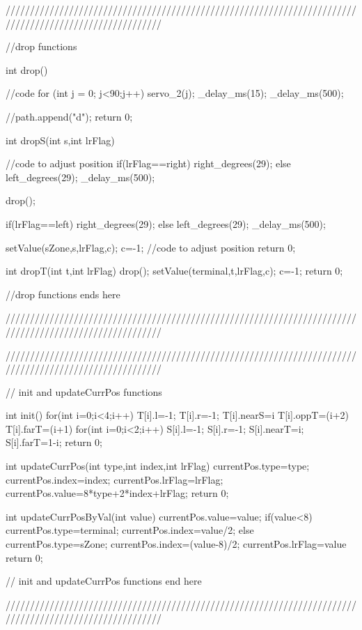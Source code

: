 ////////////////////////////////////////////////////////////////////////////////////////////////////////

//drop functions

int drop()
{
    //code
	for (int j = 0; j<90;j++)
	{ servo_2(j);
		_delay_ms(15);
	}
	_delay_ms(500);
	
    //path.append("d");
    return 0;
}

int dropS(int s,int lrFlag)
{
    //code to adjust position
    if(lrFlag==right)
    right_degrees(29);
    else
    left_degrees(29);
    _delay_ms(500);
	
	drop();
	
	if(lrFlag==left)
	right_degrees(29);
	else
	left_degrees(29);
	_delay_ms(500);

    setValue(sZone,s,lrFlag,c);
    c=-1;
    //code to adjust position
	return 0;
}

int dropT(int t,int lrFlag)
{
    drop();
    setValue(terminal,t,lrFlag,c);
    c=-1;
	return 0;
}

//drop functions ends here


////////////////////////////////////////////////////////////////////////////////////////////////////////






////////////////////////////////////////////////////////////////////////////////////////////////////////

// init and updateCurrPos functions


int init()
{
    for(int i=0;i<4;i++)
    {
        T[i].l=-1;
        T[i].r=-1;
        T[i].nearS=i%
        T[i].oppT=(i+2)%
        T[i].farT=(i+1)%
    }
    for(int i=0;i<2;i++)
    {
        S[i].l=-1;
        S[i].r=-1;
        S[i].nearT=i;
        S[i].farT=1-i;
    }
    return 0;
}

int updateCurrPos(int type,int index,int lrFlag)
{
    currentPos.type=type;
    currentPos.index=index;
    currentPos.lrFlag=lrFlag;
    currentPos.value=8*type+2*index+lrFlag;
    return 0;
}

int updateCurrPosByVal(int value)
{
    currentPos.value=value;
    if(value<8)
    {
        currentPos.type=terminal;
        currentPos.index=value/2;
    }
    else
    {
        currentPos.type=sZone;
        currentPos.index=(value-8)/2;
    }
    currentPos.lrFlag=value%
    return 0;
}

// init and updateCurrPos functions end here


////////////////////////////////////////////////////////////////////////////////////////////////////////






